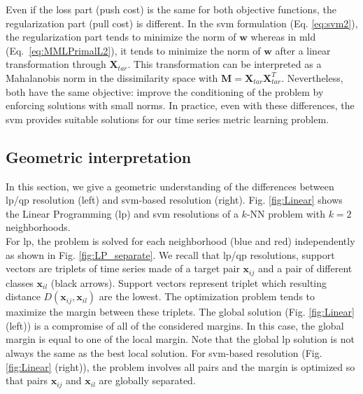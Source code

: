 \indent Even if the loss part (push cost) is the same for both objective functions, the regularization part (pull cost) is different. In the {\sc svm} formulation (Eq. \ref{eq:svm2}), the regularization part tends to minimize the norm of $\textbf{w}$ whereas in {\sc mld} (Eq.~\ref{eq:MMLPrimalL2}), it tends to minimize the norm of $\textbf{w}$ after a linear transformation through $\textbf{X}_{tar}$. This transformation can be interpreted as a Mahalanobis norm in the dissimilarity space with $\textbf{M}=\textbf{X}_{tar}\textbf{X}_{tar}^T$. Nevertheless, both have the same objective: improve the conditioning of the problem by enforcing solutions with small norms. In practice, even with these differences, the {\sc svm} provides suitable solutions for our time series metric learning problem. \\

\subsection{Geometric interpretation}
In this section, we give a geometric understanding of the differences between {\sc lp}/{\sc qp} resolution (left) and {\sc svm}-based resolution (right). Fig. \ref{fig:Linear} shows the Linear Programming ({\sc lp}) and {\sc svm} resolutions of a $k$-NN problem with $k=2$ neighborhoods. \\

For {\sc lp}, the problem is solved for each neighborhood (blue and red) independently as shown in Fig. \ref{fig:LP_separate}. We recall that {\sc lp}/{\sc qp} resolutions, support vectors are triplets of time series made of a target pair $\textbf{x}_{ij}$ and a pair of different classes $\textbf{x}_{il}$ (black arrows). Support vectors represent triplet which resulting distance $D(\textbf{x}_{ij}, \textbf{x}_{il})$ are the lowest. The optimization problem tends to maximize the margin between these triplets. The global solution (Fig. \ref{fig:Linear} (left)) is a compromise of all of the considered margins. In this case, the global margin is equal to one of the local margin. Note that the global {\sc lp} solution is not always the same as the best local solution. For {\sc svm}-based resolution (Fig. \ref{fig:Linear} (right)), the problem involves all pairs and the margin is optimized so that pairs $\textbf{x}_{ij}$ and $\textbf{x}_{il}$ are globally separated.



